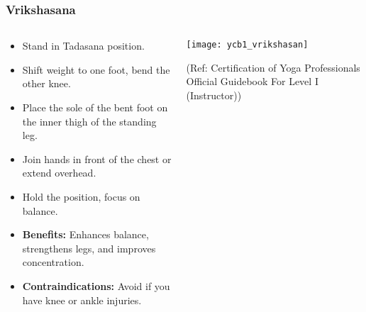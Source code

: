 \begin{frame}[fragile]\frametitle{Vrikshasana}
\begin{columns}
    \begin{column}[T]{0.5\linewidth}
      \begin{itemize}
        \item Stand in Tadasana position.
        \item Shift weight to one foot, bend the other knee.
        \item Place the sole of the bent foot on the inner thigh of the standing leg.
        \item Join hands in front of the chest or extend overhead.
        \item Hold the position, focus on balance.
        \item \textbf{Benefits:} Enhances balance, strengthens legs, and improves concentration.
        \item \textbf{Contraindications:} Avoid if you have knee or ankle injuries.
      \end{itemize}
    \end{column}
    \begin{column}[T]{0.5\linewidth}
        \begin{center}
		        \texttt{[image: ycb1\_vrikshasan]}
				
				{\tiny (Ref: Certification  of Yoga Professionals Official Guidebook For Level I (Instructor))}	        
		\end{center}    
    \end{column}
  \end{columns}
\end{frame}

